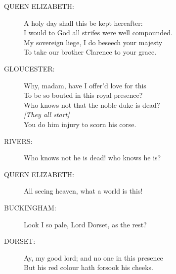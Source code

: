 \documentclass{article}
\begin{document}
\begin{description}
\item[QUEEN ELIZABETH:] 
\hspace{1pt}A holy day shall this be kept hereafter:\\
\hspace{1pt}I would to God all strifes were well compounded.\\
\hspace{1pt}My sovereign liege, I do beseech your majesty\\
\hspace{1pt}To take our brother Clarence to your grace.\\
\end{description}
\begin{description}
\item[GLOUCESTER:] 
\hspace{1pt}Why, madam, have I offer'd love for this\\
\hspace{1pt}To be so bouted in this royal presence?\\
\hspace{1pt}Who knows not that the noble duke is dead?\\
{\it [They all start]}\\
\hspace{1pt}You do him injury to scorn his corse.\\
\end{description}
\begin{description}
\item[RIVERS:] 
\hspace{1pt}Who knows not he is dead! who knows he is?\\
\end{description}
\begin{description}
\item[QUEEN ELIZABETH:] 
\hspace{1pt}All seeing heaven, what a world is this!\\
\end{description}
\begin{description}
\item[BUCKINGHAM:] 
\hspace{1pt}Look I so pale, Lord Dorset, as the rest?\\
\end{description}
\begin{description}
\item[DORSET:] 
\hspace{1pt}Ay, my good lord; and no one in this presence\\
\hspace{1pt}But his red colour hath forsook his cheeks.\\
\end{description}
\end{document}
